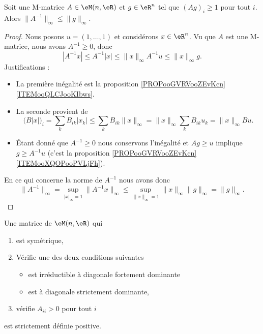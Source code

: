 \begin{theorem} \label{THOooWIFGooBQpddF}
    Soit une M-matrice \( A\in \eM(n,\eR)\) et \( g\in \eR^n\) tel que \( (Ag)_i\geq 1\) pour tout \( i\). Alors \( \| A^{-1} \|_{\infty}\leq \| g \|_{\infty}\).
\end{theorem}

\begin{proof}
    Nous posons  \( u=(1,\ldots, 1)\) et considérons \( x\in \eR^n\). Vu que \( A\) est une M-matrice, nous avons \( A^{-1}\geq 0\), donc
    \begin{equation}
        | A^{-1} x |\leq A^{-1}| x |\leq \| x \|_{\infty}A^{-1}u\leq \| x \|_{\infty}g.
    \end{equation}
    Justifications :
    \begin{itemize}
        \item La première inégalité est la proposition \ref{PROPooGVRVooZEvKcn}\ref{ITEMooQLCJooKIbws}.
        \item La seconde provient de
    \begin{equation}
        \big( B| x | \big)_i=\sum_kB_{ik}| x_k |\leq\sum_kB_{ik}\| x \|_{\infty}=\| x \|_{\infty}\sum_{k}B_{ik}u_k=\| x \|_{\infty}Bu.
    \end{equation}
\item
    Étant donné que \( A^{-1}\geq 0\) nous conservons l'inégalité et \( Ag\geq u\) implique \( g\geq A^{-1}u\) (c'est la proposition \ref{PROPooGVRVooZEvKcn}\ref{ITEMooXQOPooPVLjFh}). 
    \end{itemize}

    En ce qui concerne la norme de \( A^{-1}\) nous avons donc
    \begin{equation}
        \| A^{-1} \|_{\infty}=\sup_{| x |_{\infty}=1}\| A^{-1}x \|_{\infty}\leq \sup_{\| x \|_{\infty}=1}\| x \|_{\infty}\| g \|_{\infty}=\| g \|_{\infty}.
    \end{equation}
\end{proof}

\begin{proposition}     \label{PROPooQBWQooBbeZLO}
    Une matrice de \( \eM(n,\eR)\) qui
    \begin{enumerate}
        \item est symétrique,
        \item 
            Vérifie une des deux conditions suivantes 
            \begin{itemize}
                \item 
            est irréductible à diagonale fortement dominante
        \item
            est à diagonale strictement dominante,
            \end{itemize}
        \item vérifie \( A_{ii}>0\) pour tout \( i\)
    \end{enumerate}
     est strictement définie positive.
\end{proposition}

